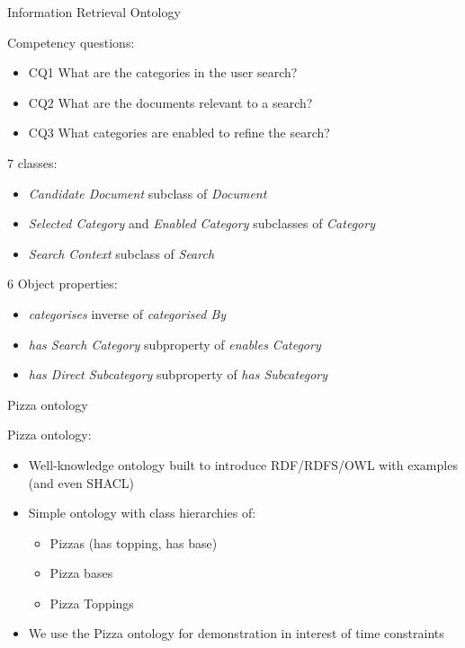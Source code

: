 \begin{frame}{Information Retrieval Ontology}

    Competency questions:
    \begin{itemize}
        \item CQ1 What are the categories in the user search?
        \item CQ2 What are the documents relevant to a search?
        \item CQ3 What categories are enabled to refine the search?
    \end{itemize}

    7 classes:
    \begin{itemize}
        \item \emph{Candidate Document} subclass of \emph{Document} 
        \item \emph{Selected Category} and \emph{Enabled Category} subclasses of \emph{Category}
        \item \emph{Search Context} subclass of \emph{Search}
    \end{itemize}

    6 Object properties:
    \begin{itemize}
        \item \emph{categorises} inverse of \emph{categorised By}
        \item \emph{has Search Category} subproperty of \emph{enables Category}
        \item \emph{has Direct Subcategory} subproperty of \emph{has Subcategory}
    \end{itemize}

\end{frame}

\begin{frame}{Pizza ontology}

    Pizza ontology:
    \begin{itemize}
        \item Well-knowledge ontology built to introduce RDF/RDFS/OWL with examples (and even SHACL)
        \item Simple ontology with class hierarchies of:
        \begin{itemize}
            \item Pizzas (has topping, has base)
            \item Pizza bases
            \item Pizza Toppings
        \end{itemize} 
    \end{itemize}

    \begin{itemize}
        \item We use the Pizza ontology for demonstration in interest of time constraints 
    \end{itemize}

\end{frame}

